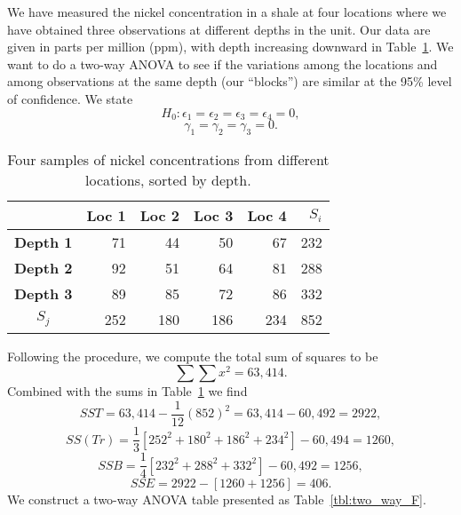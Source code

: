 \begin{example2}
We have measured the nickel concentration in a shale at four locations where we have obtained three 
observations at different depths in the unit.  Our data are given in parts per million (ppm), with depth
increasing downward in Table~\ref{tbl:two_way_nickel}.  We want to do a two-way ANOVA 
to see if the variations among the locations and among observations at the same depth (our ``blocks'') are similar 
at the 95\% level of confidence.  We state
$$
H_0: \epsilon_1 = \epsilon_2 = \epsilon_3 = \epsilon_4 = 0,$$
$$
\gamma_1 = \gamma_2 = \gamma_3 = 0.
$$
\begin{table}[H]
\center
\begin{tabular}{|c|r|r|r|r|r|} \hline
& 	  \bf{Loc 1} & \bf{Loc 2} & \bf{Loc 3} & \bf{Loc 4} & $S_i$ \\ \hline
\bf{Depth 1} & 71 & 44 & 50 & 67 & 232 \\ \hline
\bf{Depth 2} & 92 & 51 & 64 & 81 & 288 \\ \hline
\bf{Depth 3} & 89 & 85 & 72 & 86 & 332 \\ \hline
$S_j$ & 252 &  180 & 186 & 234 & 852  \\ \hline
\end{tabular}
\caption{Four samples of nickel concentrations from different locations, sorted by depth.}
\label{tbl:two_way_nickel}
\end{table}
\noindent
Following the procedure, we compute the total sum of squares to be
\begin{equation}
\sum \sum x^2 = 63,414.
\end{equation}
Combined with the sums in Table~\ref{tbl:two_way_nickel} we find
\begin{equation}
SST = 63,414 - \frac{1}{12}(852)^2 = 63,414 - 60,492 = 2922,
\end{equation}
\begin{equation}
SS(Tr) = \frac{1}{3}[252^2 + 180^2 + 186^2 + 234^2] -  60,494 = 1260,
\end{equation}
\begin{equation}
SSB = \frac{1}{4} [232^2 + 288^2  + 332^2 ] - 60,492 = 1256,
\end{equation}
\begin{equation}
SSE = 2922 - [1260 + 1256] = 406.
\end{equation}
We construct a two-way ANOVA table presented as Table~\ref{tbl:two_way_F}.
\begin{table}[H]
\center
\begin{tabular}{|c|c|c|c|c|}

\end{tabular}
\end{table}
\end{example2}
